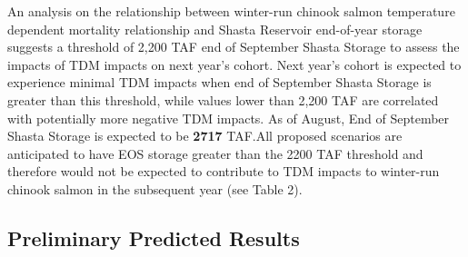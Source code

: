 \documentclass[
]{article}
\begin{document}
An analysis on the relationship between winter-run chinook salmon
temperature dependent mortality relationship and Shasta Reservoir
end-of-year storage suggests a threshold of 2,200 TAF end of September
Shasta Storage to assess the impacts of TDM impacts on next year's
cohort. Next year's cohort is expected to experience minimal TDM impacts
when end of September Shasta Storage is greater than this threshold,
while values lower than 2,200 TAF are correlated with potentially more
negative TDM impacts. As of August, End of September Shasta Storage is
expected to be \textbf{2717} TAF.All proposed scenarios are anticipated
to have EOS storage greater than the 2200 TAF threshold and therefore
would not be expected to contribute to TDM impacts to winter-run chinook
salmon in the subsequent year (see Table 2).

\hypertarget{preliminary-predicted-results}{%
\subsection{Preliminary Predicted
Results}\label{preliminary-predicted-results}}
\end{document}
